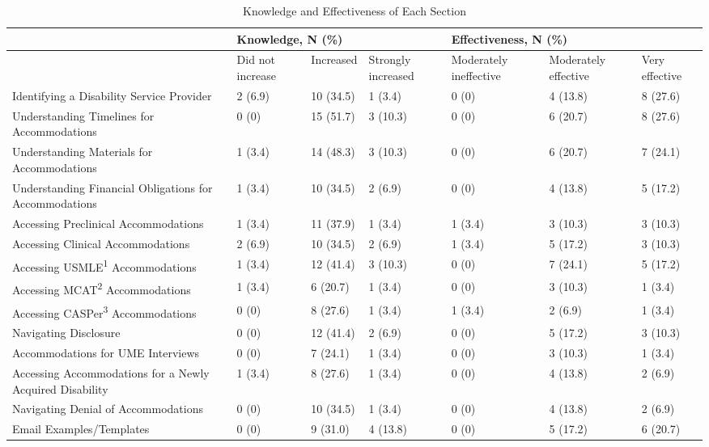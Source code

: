 \documentclass[11.5pt]{sig-alternate} %
\begin{document}
\begin{large}
\begin{table}[htp]
\caption{Knowledge and Effectiveness of Each Section}
\begin{tabular}{|l|l|l|l|l|l|l|}
\hline
& \multicolumn{3}{|l|}{Knowledge, N (\%)} & \multicolumn{3}{|l|}{Effectiveness, N (\%)} \\ \hline
& Did not increase & Increased & Strongly increased & Moderately ineffective & Moderately effective & Very effective \\ \hline
Identifying a Disability Service Provider & 2 (6.9) & 10 (34.5) & 1 (3.4) & 0 (0) & 4 (13.8) & 8 (27.6) \\ \hline
Understanding Timelines for Accommodations & 0 (0) & 15 (51.7) & 3 (10.3) & 0 (0) & 6 (20.7) & 8 (27.6) \\ \hline
Understanding Materials for Accommodations & 1 (3.4) & 14 (48.3) & 3 (10.3) & 0 (0) & 6 (20.7) & 7 (24.1) \\ \hline
Understanding Financial Obligations for Accommodations & 1 (3.4) & 10 (34.5) & 2 (6.9) & 0 (0) & 4 (13.8) & 5 (17.2) \\ \hline
Accessing Preclinical Accommodations & 1 (3.4) & 11 (37.9) & 1 (3.4) & 1 (3.4) & 3 (10.3) & 3 (10.3) \\ \hline
Accessing Clinical Accommodations & 2 (6.9) & 10 (34.5) & 2 (6.9) & 1 (3.4) & 5 (17.2) & 3 (10.3) \\ \hline
Accessing USMLE\textsuperscript{1} Accommodations & 1 (3.4) & 12 (41.4) & 3 (10.3) & 0 (0) & 7 (24.1) & 5 (17.2) \\ \hline
Accessing MCAT\textsuperscript{2} Accommodations & 1 (3.4) & 6 (20.7) & 1 (3.4) & 0 (0) & 3 (10.3) & 1 (3.4) \\ \hline
Accessing CASPer\textsuperscript{3} Accommodations & 0 (0) & 8 (27.6) & 1 (3.4) & 1 (3.4) & 2 (6.9) & 1 (3.4) \\ \hline
Navigating Disclosure & 0 (0) & 12 (41.4) & 2 (6.9) & 0 (0) & 5 (17.2) & 3 (10.3) \\ \hline
Accommodations for UME Interviews & 0 (0) & 7 (24.1) & 1 (3.4) & 0 (0) & 3 (10.3) & 1 (3.4) \\ \hline
Accessing Accommodations for a Newly Acquired Disability & 1 (3.4) & 8 (27.6) & 1 (3.4) & 0 (0) & 4 (13.8) & 2 (6.9) \\ \hline
Navigating Denial of Accommodations & 0 (0) & 10 (34.5) & 1 (3.4) & 0 (0) & 4 (13.8) & 2 (6.9) \\ \hline
Email Examples/Templates & 0 (0) & 9 (31.0) & 4 (13.8) & 0 (0) & 5 (17.2) & 6 (20.7) \\ \hline

\end{tabular}
\end{table}
\end{large}
\end{document}
